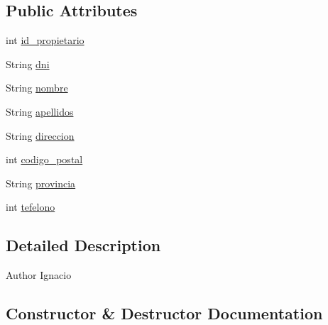 \subsection*{Public Attributes}
\begin{DoxyCompactItemize}
\item 
int \mbox{\hyperlink{classjavaapplication20_1_1_propietarios_a0d9654913e9342d45346e4b8086c99fd}{id\+\_\+propietario}}
\item 
String \mbox{\hyperlink{classjavaapplication20_1_1_propietarios_ab18a08d3653627babc033432dbb281e8}{dni}}
\item 
String \mbox{\hyperlink{classjavaapplication20_1_1_propietarios_a829d4d9b2f229a3b406b426fe3af9f18}{nombre}}
\item 
String \mbox{\hyperlink{classjavaapplication20_1_1_propietarios_a9b897b9be023e6bfe54f693f6abd4990}{apellidos}}
\item 
String \mbox{\hyperlink{classjavaapplication20_1_1_propietarios_a65fcf66e9d2944122d66c3ea3593feb5}{direccion}}
\item 
int \mbox{\hyperlink{classjavaapplication20_1_1_propietarios_a3b56a934dce029ef1cb5d5f61d189538}{codigo\+\_\+postal}}
\item 
String \mbox{\hyperlink{classjavaapplication20_1_1_propietarios_a4d34e2698807c08fa013a2a24fb0aecf}{provincia}}
\item 
int \mbox{\hyperlink{classjavaapplication20_1_1_propietarios_aed6eadeca2eaedfde708ff2b39606bf9}{tefelono}}
\end{DoxyCompactItemize}


\subsection{Detailed Description}
\begin{DoxyAuthor}{Author}
Ignacio 
\end{DoxyAuthor}


\subsection{Constructor \& Destructor Documentation}
\mbox{\label{classjavaapplication20_1_1_propietarios_ae21fb6967fd3c71061c60b91e5bfdb7b}} 
